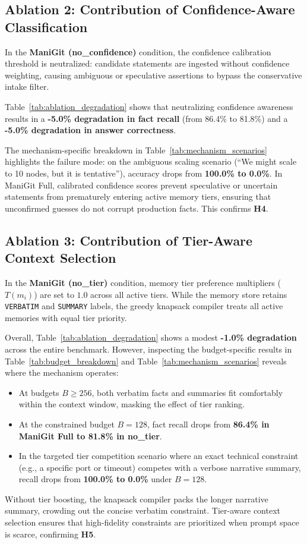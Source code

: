 \subsection{Ablation 2: Contribution of Confidence-Aware Classification}
In the \textbf{ManiGit (no\_confidence)} condition, the confidence calibration threshold is neutralized: candidate statements are ingested without confidence weighting, causing ambiguous or speculative assertions to bypass the conservative intake filter.

Table~\ref{tab:ablation_degradation} shows that neutralizing confidence awareness results in a \textbf{-5.0\% degradation in fact recall} (from 86.4\% to 81.8\%) and a \textbf{-5.0\% degradation in answer correctness}.

The mechanism-specific breakdown in Table~\ref{tab:mechanism_scenarios} highlights the failure mode: on the ambiguous scaling scenario (``We might scale to 10 nodes, but it is tentative''), accuracy drops from \textbf{100.0\% to 0.0\%}. In ManiGit Full, calibrated confidence scores prevent speculative or uncertain statements from prematurely entering active memory tiers, ensuring that unconfirmed guesses do not corrupt production facts. This confirms \textbf{H4}.



\subsection{Ablation 3: Contribution of Tier-Aware Context Selection}
In the \textbf{ManiGit (no\_tier)} condition, memory tier preference multipliers ($T(m_i)$) are set to $1.0$ across all active tiers. While the memory store retains \texttt{VERBATIM} and \texttt{SUMMARY} labels, the greedy knapsack compiler treats all active memories with equal tier priority.

Overall, Table~\ref{tab:ablation_degradation} shows a modest \textbf{-1.0\% degradation} across the entire benchmark. However, inspecting the budget-specific results in Table~\ref{tab:budget_breakdown} and Table~\ref{tab:mechanism_scenarios} reveals where the mechanism operates:
\begin{itemize}
    \item At budgets $B \ge 256$, both verbatim facts and summaries fit comfortably within the context window, masking the effect of tier ranking.
    \item At the constrained budget \textbf{$B=128$}, fact recall drops from \textbf{86.4\% in ManiGit Full to 81.8\% in no\_tier}.
    \item In the targeted tier competition scenario where an exact technical constraint (e.g., a specific port or timeout) competes with a verbose narrative summary, recall drops from \textbf{100.0\% to 0.0\%} under $B=128$.
\end{itemize}
Without tier boosting, the knapsack compiler packs the longer narrative summary, crowding out the concise verbatim constraint. Tier-aware context selection ensures that high-fidelity constraints are prioritized when prompt space is scarce, confirming \textbf{H5}.
